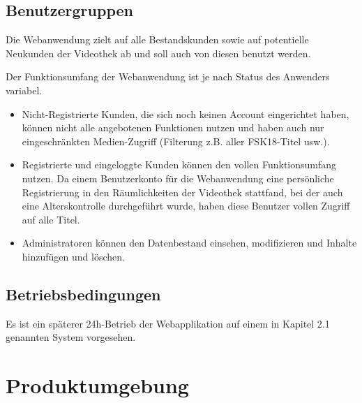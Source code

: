 \documentclass[12pt,oneside,a4paper,bibtotoc,liststotoc,pointlessnumbers]{scrartcl}
\begin{document}
\subsection{Benutzergruppen}
Die Webanwendung zielt auf alle Bestandskunden sowie auf potentielle Neukunden der Videothek ab und soll auch von diesen benutzt werden.\par
Der Funktionsumfang der Webanwendung ist je nach Status des Anwenders variabel.
\begin{itemize}
\item Nicht-Registrierte Kunden, die sich noch keinen Account eingerichtet haben, können nicht alle angebotenen Funktionen nutzen und haben auch nur eingeschränkten Medien-Zugriff (Filterung z.B. aller FSK18-Titel usw.).
\item Registrierte und eingeloggte Kunden können den vollen Funktionsumfang nutzen. Da einem Benutzerkonto für die Webanwendung eine persönliche Registrierung in den Räumlichkeiten der Videothek stattfand, bei der auch eine Alterskontrolle durchgeführt wurde, haben diese Benutzer vollen Zugriff auf alle Titel.
\item Administratoren können den Datenbestand einsehen, modifizieren und Inhalte hinzufügen und löschen.
\end{itemize}
\subsection{Betriebsbedingungen}
Es ist ein späterer 24h-Betrieb der Webapplikation auf einem in Kapitel 2.1 genannten System vorgesehen.
\newpage
\section{Produktumgebung}
\end{document}
